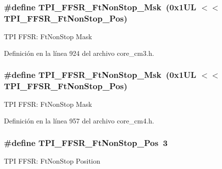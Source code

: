 \subsubsection[{\texorpdfstring{T\+P\+I\+\_\+\+F\+F\+S\+R\+\_\+\+Ft\+Non\+Stop\+\_\+\+Msk}{TPI_FFSR_FtNonStop_Msk}}]{\setlength{\rightskip}{0pt plus 5cm}\#define T\+P\+I\+\_\+\+F\+F\+S\+R\+\_\+\+Ft\+Non\+Stop\+\_\+\+Msk~(0x1\+U\+L $<$$<$ T\+P\+I\+\_\+\+F\+F\+S\+R\+\_\+\+Ft\+Non\+Stop\+\_\+\+Pos)}\hypertarget{group___c_m_s_i_s___t_p_i_gaaa313f980974a8cfc7dac68c4d805ab1}{}\label{group___c_m_s_i_s___t_p_i_gaaa313f980974a8cfc7dac68c4d805ab1}
T\+PI F\+F\+SR\+: Ft\+Non\+Stop Mask 

Definición en la línea 924 del archivo core\+\_\+cm3.\+h.

\subsubsection[{\texorpdfstring{T\+P\+I\+\_\+\+F\+F\+S\+R\+\_\+\+Ft\+Non\+Stop\+\_\+\+Msk}{TPI_FFSR_FtNonStop_Msk}}]{\setlength{\rightskip}{0pt plus 5cm}\#define T\+P\+I\+\_\+\+F\+F\+S\+R\+\_\+\+Ft\+Non\+Stop\+\_\+\+Msk~(0x1\+U\+L $<$$<$ T\+P\+I\+\_\+\+F\+F\+S\+R\+\_\+\+Ft\+Non\+Stop\+\_\+\+Pos)}\hypertarget{group___c_m_s_i_s___t_p_i_gaaa313f980974a8cfc7dac68c4d805ab1}{}\label{group___c_m_s_i_s___t_p_i_gaaa313f980974a8cfc7dac68c4d805ab1}
T\+PI F\+F\+SR\+: Ft\+Non\+Stop Mask 

Definición en la línea 957 del archivo core\+\_\+cm4.\+h.

\subsubsection[{\texorpdfstring{T\+P\+I\+\_\+\+F\+F\+S\+R\+\_\+\+Ft\+Non\+Stop\+\_\+\+Pos}{TPI_FFSR_FtNonStop_Pos}}]{\setlength{\rightskip}{0pt plus 5cm}\#define T\+P\+I\+\_\+\+F\+F\+S\+R\+\_\+\+Ft\+Non\+Stop\+\_\+\+Pos~3}\hypertarget{group___c_m_s_i_s___t_p_i_ga9537b8a660cc8803f57cbbee320b2fc8}{}\label{group___c_m_s_i_s___t_p_i_ga9537b8a660cc8803f57cbbee320b2fc8}
T\+PI F\+F\+SR\+: Ft\+Non\+Stop Position 

